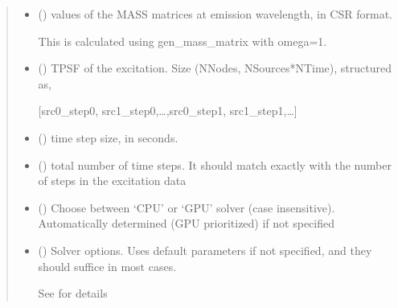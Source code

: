 \documentclass[letterpaper,10pt,english]{sphinxmanual}
\begin{document}
\begin{fulllineitems}
\begin{quote}
\begin{description}
\begin{itemize}
\item {} 
\sphinxAtStartPar
{} () \textendash{} 
\sphinxAtStartPar
values of the MASS matrices at emission wavelength, in CSR format.

\sphinxAtStartPar
This is calculated using gen\_mass\_matrix with omega=1.


\item {} 
\sphinxAtStartPar
{} () \textendash{} 
\sphinxAtStartPar
TPSF of the excitation. Size (NNodes, NSources*NTime), structured as,

\sphinxAtStartPar
{[}src0\_step0, src1\_step0,…,src0\_step1, src1\_step1,…{]}


\item {} 
\sphinxAtStartPar
{} () \textendash{} time step size, in seconds.

\item {} 
\sphinxAtStartPar
{} () \textendash{} total number of time steps. It should match exactly with the number of steps in the excitation data

\item {} 
\sphinxAtStartPar
{} (\sphinxstyleliteralemphasis{\sphinxupquote{, }}) \textendash{} Choose between ‘CPU’ or ‘GPU’ solver (case insensitive). Automatically determined (GPU prioritized) if not specified

\item {} 
\sphinxAtStartPar
{} ({\hyperref[\detokenize{_autosummary/nirfasterff.utils.SolverOptions:nirfasterff.utils.SolverOptions}]{}}\sphinxstyleliteralemphasis{\sphinxupquote{, }}) \textendash{} 
\sphinxAtStartPar
Solver options. Uses default parameters if not specified, and they should suffice in most cases.

\sphinxAtStartPar
See {\hyperref[\detokenize{_autosummary/nirfasterff.utils.SolverOptions:nirfasterff.utils.SolverOptions}]{}} for details



\end{itemize}
\end{description}
\end{quote}
\end{fulllineitems}
\end{document}
